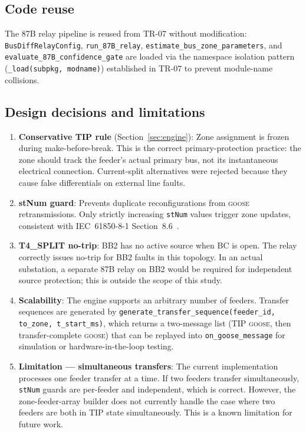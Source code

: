 \documentclass[11pt,a4paper]{article}
\newcommand{\goose}{\textsc{goose}}
\begin{document}
\subsection{Code reuse}

The 87B relay pipeline is reused from TR-07 without modification:
\texttt{BusDiffRelayConfig}, \texttt{run\_87B\_relay},
\texttt{estimate\_bus\_zone\_parameters}, and
\texttt{evaluate\_87B\_confidence\_gate} are loaded via the namespace
isolation pattern (\texttt{\_load(subpkg, modname)}) established in TR-07
to prevent module-name collisions.

\subsection{Design decisions and limitations}

\begin{enumerate}
  \item \textbf{Conservative TIP rule} (Section~\ref{sec:engine}):
        Zone assignment is frozen during make-before-break.  This is the
        correct primary-protection practice: the zone should track the
        feeder's actual primary bus, not its instantaneous electrical
        connection.  Current-split alternatives were rejected because they
        cause false differentials on external line faults.

  \item \textbf{stNum guard}: Prevents duplicate reconfigurations from
        \goose{} retransmissions.  Only strictly increasing \texttt{stNum}
        values trigger zone updates, consistent with IEC~61850-8-1
        Section~8.6~\cite{IEC61850_8_1}.

  \item \textbf{T4\_SPLIT no-trip}: BB2 has no active source when BC is
        open.  The relay correctly issues no-trip for BB2 faults in this
        topology.  In an actual substation, a separate 87B relay on BB2
        would be required for independent source protection; this is outside
        the scope of this study.

  \item \textbf{Scalability}: The engine supports an arbitrary number of
        feeders.  Transfer sequences are generated by
        \texttt{generate\_transfer\_sequence(feeder\_id, to\_zone,
        t\_start\_ms)}, which returns a two-message list
        (TIP \goose{}, then transfer-complete \goose{}) that can be
        replayed into \texttt{on\_goose\_message} for simulation or
        hardware-in-the-loop testing.

  \item \textbf{Limitation --- simultaneous transfers}: The current
        implementation processes one feeder transfer at a time.  If two
        feeders transfer simultaneously, \texttt{stNum} guards are
        per-feeder and independent, which is correct.  However, the
        zone-feeder-array builder does not currently handle the case where
        two feeders are both in TIP state simultaneously.  This is a known
        limitation for future work.
\end{enumerate}
\end{document}

